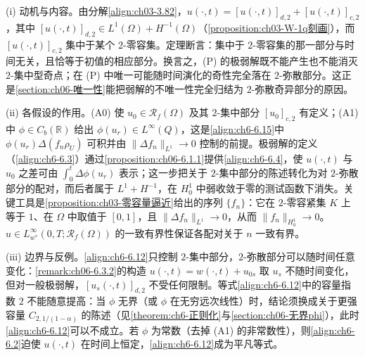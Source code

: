 \documentclass[../../main.tex]{subfiles}%
\begin{document}
\begin{remark}\label{remark:ch06-持续动机}
(i) 动机与内容。由分解\eqref{align:ch03-3.82}，$u(\cdot,t)=[u(\cdot,t)]_{d,2}+[u(\cdot,t)]_{c,2}$，其中 $[u(\cdot,t)]_{d,2}\in L^1(\Omega)+H^{-1}(\Omega)$（\cref{proposition:ch03-W-1q刻画}），而 $[u(\cdot,t)]_{c,2}$ 集中于某个 $2$-零容集。定理断言：集中于 $2$-零容集的那一部分与时间无关，且恰等于初值的相应部分。换言之，(P) 的极弱解既不能产生也不能消灭 $2$-集中型奇点；在 (P) 中唯一可能随时间演化的奇性完全落在 $2$-弥散部分。这正是\cref{section:ch06-唯一性}能把弱解的不唯一性完全归结为 $2$-弥散奇异部分的原因。

(ii) 各假设的作用。(A0) 使 $u_0\in\mathscr{R}_f(\Omega)$ 及其 $2$-集中部分 $[u_0]_{c,2}$ 有定义；(A1) 中 $\phi\in C_b(\mathbb{R})$ 给出 $\phi(u_r)\in L^\infty(Q)$，这是\eqref{align:ch6-6.15}中 $\phi(u_r)\Delta(f_n\rho_U)$ 可积并由 $\|\Delta f_n\|_{L^1}\to0$ 控制的前提。极弱解的定义（\eqref{align:ch6-6.3}）通过\cref{proposition:ch06-6.1.1}提供\eqref{align:ch6-6.4}，使 $u(\cdot,t)$ 与 $u_0$ 之差可由 $\int_0^t\Delta\phi(u_r)$ 表示；这一步把关于 $2$-集中部分的陈述转化为对 $2$-弥散部分的配对，而后者属于 $L^1+H^{-1}$，在 $H^1_0$ 中弱收敛于零的测试函数下消失。关键工具是\cref{proposition:ch03-零容量逼近}给出的序列 $\{f_n\}$：它在 $2$-零容紧集 $K$ 上等于 $1$、在 $\Omega$ 中取值于 $[0,1]$，且 $\|\Delta f_n\|_{L^1}\to0$，从而 $\|f_n\|_{H^1_0}\to0$。$u\in L^\infty_{w^*}(0,T;\mathscr{R}_f(\Omega))$ 的一致有界性保证各配对关于 $n$ 一致有界。

(iii) 边界与反例。\eqref{align:ch6-6.12}只控制 $2$-集中部分，$2$-弥散部分可以随时间任意变化：\cref{remark:ch06-6.3.2}的构造 $u(\cdot,t)=w(\cdot,t)+u_{0s}$ 取 $u_s$ 不随时间变化，但对一般极弱解，$[u_s(\cdot,t)]_{d,2}$ 不受任何限制。等式\eqref{align:ch6-6.12}中的容量指数 $2$ 不能随意提高：当 $\phi$ 无界（或 $\phi$ 在无穷远次线性）时，结论须换成关于更强容量 $C_{2,1/(1-\alpha)}$ 的陈述（见\cref{theorem:ch6-正则化}与\cref{section:ch06-无界phi}），此时\eqref{align:ch6-6.12}可以不成立。若 $\phi$ 为常数（去掉 (A1) 的非常数性），则\eqref{align:ch6-6.2}迫使 $u(\cdot,t)$ 在时间上恒定，\eqref{align:ch6-6.12}成为平凡等式。
\end{remark}
\end{document}
